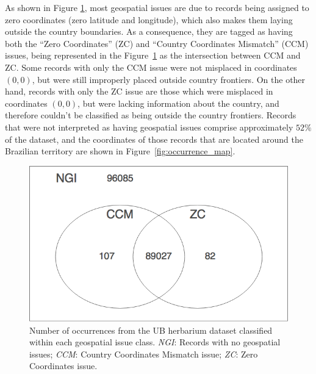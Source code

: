 As shown in Figure \ref{fig:venn_geospatial_issues}, most geospatial issues are due to records being assigned to zero coordinates (zero latitude and longitude), which also makes them laying outside the country boundaries. 
As a consequence, they are tagged as having both the ``Zero Coordinates'' (ZC) and ``Country Coordinates Mismatch'' (CCM) issues, being represented in the Figure~\ref{fig:venn_geospatial_issues} as the intersection between CCM and ZC.
Some records with only the CCM issue were not misplaced in coordinates $(0,0)$, but were still improperly placed outside country frontiers. 
On the other hand, records with only the ZC issue are those which were misplaced in coordinates $(0,0)$, but were lacking information about the country, and therefore couldn't be classified as being outside the country frontiers.
Records that were not interpreted as having geospatial issues comprise approximately $52\%$ of the dataset, and the coordinates of those records that are located around the Brazilian territory are shown in Figure~\ref{fig:occurrence_map}. 

  \begin{figure}[ht]
  	\centering
    \includegraphics[width=0.6\linewidth]{figures/venn_geospatial_issues.png}
    \caption[Number of occurrences from the UB herbarium dataset classified within each geospatial issue class.]{Number of occurrences from the UB herbarium dataset classified within each geospatial issue class. \textit{NGI}: Records with no geospatial issues; \textit{CCM}: Country Coordinates Mismatch issue; \textit{ZC}: Zero Coordinates issue.}
    \label{fig:venn_geospatial_issues}
  \end{figure}


